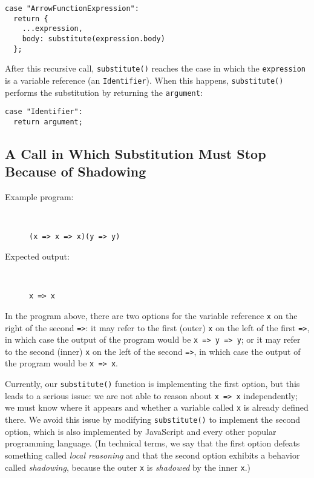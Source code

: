 \documentclass[12pt, oneside]{book}
\begin{document}
\begin{verbatim}
case "ArrowFunctionExpression":
  return {
    ...expression,
    body: substitute(expression.body)
  };
\end{verbatim}

After this recursive call, \texttt{substitute()} reaches the case in which the \texttt{expression} is a variable reference (an \texttt{Identifier}). When this happens, \texttt{substitute()} performs the substitution by returning the \texttt{argument}:

\begin{verbatim}
case "Identifier":
  return argument;
\end{verbatim}

\subsection{A Call in Which Substitution Must Stop Because of Shadowing}

\begin{description}
\item [Example program:] ~

\begin{verbatim}
(x => x => x)(y => y)
\end{verbatim}

\item [Expected output:] ~

\begin{verbatim}
x => x
\end{verbatim}
\end{description}

In the program above, there are two options for the variable reference \texttt{x} on the right of the second \texttt{=>}: it may refer to the first (outer) \texttt{x} on the left of the first \texttt{=>}, in which case the output of the program would be \texttt{x => y => y}; or it may refer to the second (inner) \texttt{x} on the left of the second \texttt{=>}, in which case the output of the program would be \texttt{x => x}.

Currently, our \texttt{substitute()} function is implementing the first option, but this leads to a serious issue: we are not able to reason about \texttt{x => x} independently; we must know where it appears and whether a variable called \texttt{x} is already defined there. We avoid this issue by modifying \texttt{substitute()} to implement the second option, which is also implemented by JavaScript and every other popular programming language. (In technical terms, we say that the first option defeats something called \emph{local reasoning} and that the second option exhibits a behavior called \emph{shadowing}, because the outer \texttt{x} is \emph{shadowed} by the inner \texttt{x}.)
\end{document}
